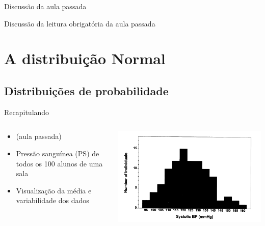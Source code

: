 \documentclass{beamer}
\begin{document}

\begin{frame}{\scriptsize Discussão da aula passada}
  \begin{block}{}
    Discussão da leitura obrigatória da aula passada
  \end{block}
\end{frame}

\section{A distribuição Normal}

\subsection{Distribuições de probabilidade}

\begin{frame}{\scriptsize Recapitulando}
  \begin{columns}
    \begin{column}{5cm}
      \begin{itemize}
        \scriptsize
      \item ({\tiny aula passada})
        \bigskip
      \item Pressão sanguínea (PS) de todos os 100 alunos de uma sala
        \medskip
      \item Visualização da média e variabilidade dos dados
      \end{itemize}
    \end{column}
    \begin{column}{5cm}
      \includegraphics[width=\textwidth]{Cap3/histograma1}
    \end{column}
  \end{columns}
\end{frame}
\end{document}
